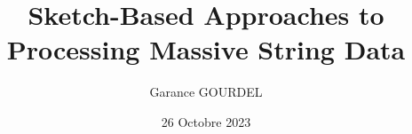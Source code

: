 





\author{Garance GOURDEL}

\title{Sketch-Based Approaches to Processing Massive String Data}
\date{26 Octobre 2023}



